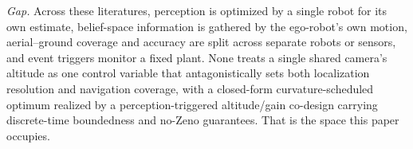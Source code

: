 \medskip\noindent\emph{Gap.} Across these literatures, perception is optimized by a
single robot for its own estimate, belief-space information is gathered by the
ego-robot's own motion, aerial--ground coverage and accuracy are split across separate
robots or sensors, and event triggers monitor a fixed plant. None treats a single
shared camera's altitude as one control variable that antagonistically sets both
localization resolution and navigation coverage, with a closed-form curvature-scheduled
optimum realized by a perception-triggered altitude/gain co-design carrying
discrete-time boundedness and no-Zeno guarantees. That is the space this paper occupies.

